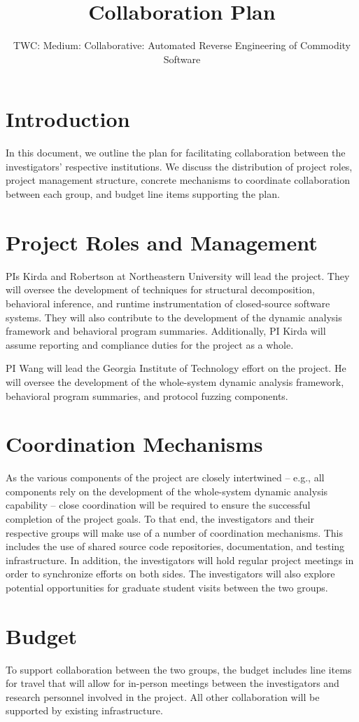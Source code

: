\documentclass[letterpaper,11pt]{scrartcl}
\newcommand{\thetitle}{TWC: Medium: Collaborative: Automated Reverse Engineering of Commodity Software\xspace}
\begin{document}
\title{Collaboration Plan}
\subtitle{\thetitle}
\author{}
\date{}
\maketitle

\section{Introduction}
\label{sec:introduction}

In this document, we outline the plan for facilitating collaboration between
the investigators' respective institutions.  We discuss the distribution of
project roles, project management structure, concrete mechanisms to coordinate
collaboration between each group, and budget line items supporting the plan.

\section{Project Roles and Management}
\label{sec:roles}

PIs Kirda and Robertson at Northeastern University will lead the project. They
will oversee the development of techniques for structural decomposition,
behavioral inference, and runtime instrumentation of closed-source software
systems.  They will also contribute to the development of the dynamic analysis
framework and behavioral program summaries.  Additionally, PI Kirda will
assume reporting and compliance duties for the project as a whole.

PI Wang will lead the Georgia Institute of Technology effort on the project.
He will oversee the development of the whole-system dynamic analysis
framework, behavioral program summaries, and protocol fuzzing components.

\section{Coordination Mechanisms}
\label{sec:coordination}

As the various components of the project are closely intertwined -- e.g., all
components rely on the development of the whole-system dynamic analysis
capability -- close coordination will be required to ensure the successful
completion of the project goals.  To that end, the investigators and their
respective groups will make use of a number of coordination mechanisms.  This
includes the use of shared source code repositories, documentation, and
testing infrastructure.  In addition, the investigators will hold regular
project meetings  in order to synchronize efforts on both sides.  The
investigators will also explore potential opportunities for graduate student
visits between the two groups.

\section{Budget}
\label{sec:budget}

To support collaboration between the two groups, the budget includes line
items for travel that will allow for in-person meetings between the
investigators and research personnel involved in the project.  All other
collaboration will be supported by existing infrastructure.
\end{document}
